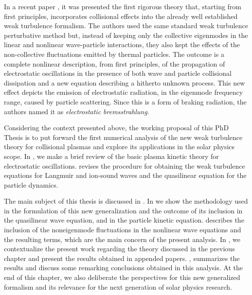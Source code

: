 \documentclass[12pt,a4paper,ruledheader]{report}
\begin{document}
In a recent paper \cite{YZKS16}, it was presented the first rigorous
theory that, starting from first principles, incorporates collisional
effects into the already well established weak turbulence formalism.
The authors used the same standard weak turbulence perturbative method
but, instead of keeping only the collective eigenmodes in the linear
and nonlinear wave-particle interactions, they also kept the effects
of the non-collective fluctuations emitted by thermal particles. The
outcome is a complete nonlinear description, from first principles, of
the propagation of electrostatic oscillations in the presence of both
wave and particle collisional dissipation and a new equation describing
a hitherto unknown process. This new effect depicts the emission of
electrostatic radiation, in the eigenmode frequency range, caused by
particle scattering. Since this is a form of braking radiation, the
authors named it as \emph{electrostatic bremsstrahlung}.

Considering the context presented above, the working proposal of this PhD
Thesis is to put forward the first numerical analysis of the new weak
turbulence theory for collisional plasmas \cite{YZKS16} and explore its
applications in the solar physics scope. In , we make
a brief review of the basic plasma kinetic theory for electrostatic
oscillations.  revises the procedure for obtaining
the weak turbulence equations for Langmuir and ion-sound waves and
the quasilinear equation for the particle dynamics.

The main subject of this thesis is discussed in . In
 we show the methodology used in the formulation of this
new generalization and the outcome of its inclusion in the quasilinear
wave equation, and in the particle kinetic equation. 
describes the inclusion of the noneigenmode fluctuations in the nonlinear
wave equations and the resulting terms, which are the main concern of
the present analysis. In , we contextualize the present work
regarding the theory discussed in the previous chapter and present the
results obtained in appended papers. , summarizes the
results and discuss some remarking conclusions obtained in this analysis.
At the end of this chapter, we also deliberate the perspectives for this
new generalized formalism and its relevance for the next generation of
solar physics research.
\end{document}
